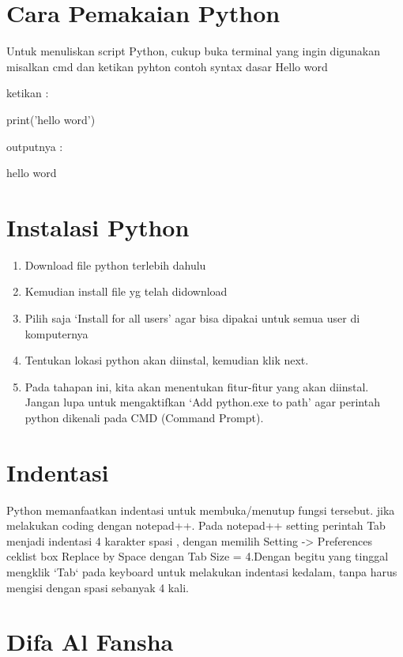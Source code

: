 \section{Cara Pemakaian Python}
\par
Untuk menuliskan script Python, cukup buka terminal yang ingin digunakan misalkan cmd dan ketikan pyhton
contoh syntax dasar Hello word
\par
ketikan :
\par
print('hello word')
\par
outputnya :
\par
hello word

\section{Instalasi Python}
\begin{enumerate}
\item
Download file python terlebih dahulu
\item
Kemudian install file yg telah didownload
\item
Pilih saja ‘Install for all users’ agar bisa dipakai untuk semua user di komputernya
\item
Tentukan lokasi python akan diinstal, kemudian klik next.
\item
Pada tahapan ini, kita akan menentukan fitur-fitur yang akan diinstal.
Jangan lupa untuk mengaktifkan ‘Add python.exe to path’ agar perintah python dikenali pada CMD (Command Prompt).
\end{enumerate}

\section{Indentasi}
\par
Python memanfaatkan indentasi untuk membuka/menutup fungsi tersebut. jika melakukan coding dengan notepad++. Pada notepad++ setting perintah Tab menjadi indentasi 4 karakter spasi , dengan memilih Setting -> Preferences ceklist box Replace by Space dengan Tab Size = 4.Dengan begitu yang tinggal mengklik ‘Tab‘ pada keyboard untuk melakukan indentasi kedalam, tanpa harus  mengisi dengan spasi sebanyak 4 kali.



\section{Difa Al Fansha}
